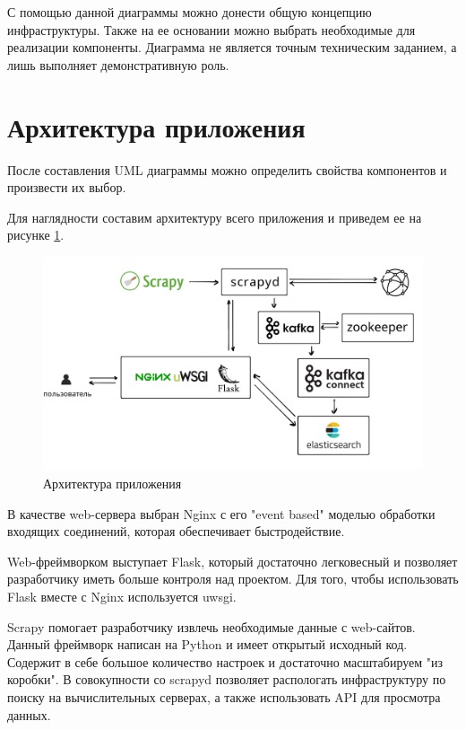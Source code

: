 С помощью данной диаграммы можно донести общую концепцию инфраструктуры. Также
на ее основании можно выбрать необходимые для реализации компоненты. Диаграмма
не является точным техническим заданием, а лишь выполняет демонстративную роль.

\section{Архитектура приложения}
После составления UML диаграммы можно определить свойства компонентов и
произвести их выбор.

Для наглядности составим архитектуру всего приложения и приведем ее на рисунке
\ref{fig:structure}.
\begin{figure}[H]
    \centering
    \includegraphics[scale=0.80]{inc/img/structure.png}
    \caption{Архитектура приложения}
    \label{fig:structure}
\end{figure}

В качестве web-сервера выбран Nginx с его "event based" моделью обработки
входящих соединений, которая обеспечивает быстродействие.

Web-фреймворком выступает Flask, который достаточно легковесный и позволяет
разработчику иметь больше контроля над проектом. Для того, чтобы использовать
Flask вместе с Nginx используется uwsgi.

Scrapy помогает разработчику извлечь необходимые данные с web-сайтов. Данный
фреймворк написан на Python и имеет открытый исходный код. Содержит в себе
большое количество настроек и достаточно масштабируем "из коробки". В
совокупности со scrapyd позволяет распологать инфраструктуру по поиску на
вычислительных серверах, а также использовать API для просмотра данных.

